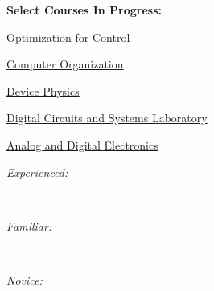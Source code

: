 \documentclass[10pt,a4paper,ragged2e,withhyper]{altacv}
\begin{document}
\begin{paracol}{2}
\begin{multicols}{2}
    \columnbreak
    
    \textbf{Select Courses In Progress:}
    \vspace{0.375cm}
    \begin{tightemize}
        \item \href{https://ece.umd.edu/course-schedule/course/ENEE469O}{Optimization for Control}
        \item \href{https://ece.umd.edu/course-schedule/course/ENEE350}{Computer Organization}
        \item \href{https://ece.umd.edu/course-schedule/course/ENEE313H}{Device Physics}
        \item \href{https://ece.umd.edu/course-schedule/course/ENEE245}{Digital Circuits and Systems Laboratory}
        \item \href{https://ece.umd.edu/course-schedule/course/ENEE303}{Analog and Digital Electronics}
    \end{tightemize}

\end{multicols}


\vspace{-0.375cm}


\textit{Experienced:}

\vspace{0.125cm}

      \\

\divider

\textit{Familiar:}

\vspace{0.125cm}

       \cvtag{\LaTeX}  \\

\divider

\textit{Novice:}

\vspace{0.125cm}

    


\vspace{-0.75cm}


\end{paracol}
\end{document}
